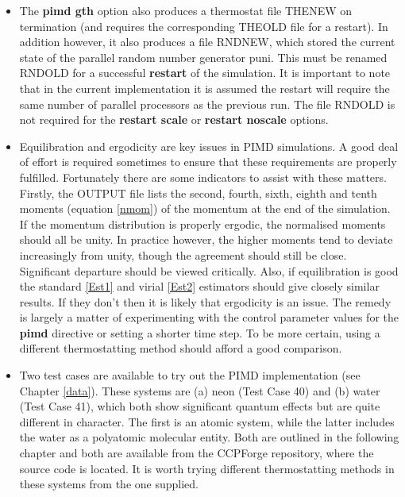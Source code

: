 \begin{itemize}
 \item The {\bf pimd gth} option also produces a thermostat file
   THENEW  on termination (and requires the
   corresponding THEOLD file for a restart). In addition however, it
   also produces a file RNDNEW,  which stored the
   current state of the \DD parallel random number generator {\sc
     puni}. This must be renamed RNDOLD  for a
   successful {\bf restart} of the simulation. It is important to
   note that in the current implementation it is assumed the restart
   will require the same number of parallel processors as the previous
   run. The file RNDOLD is not required for the {\bf restart scale} or
   {\bf restart noscale} options.

\item Equilibration and ergodicity are key issues in PIMD
  simulations. A good deal of effort is required sometimes to ensure
  that these requirements are properly fulfilled. Fortunately there
  are some indicators to assist with these matters. Firstly, the
  OUTPUT file lists the second, fourth, sixth, eighth and tenth
  moments (equation \ref{nmom}) of the momentum at the end of the
  simulation. If the momentum distribution is properly ergodic, the
  normalised moments should all be unity. In practice however, the
  higher moments tend to deviate increasingly from unity, though the
  agreement should still be close. Significant departure should be
  viewed critically. Also, if equilibration is good the standard
  \ref{Est1} and virial \ref{Est2} estimators should give closely
  similar results. If they don't then it is likely that ergodicity is
  an issue. The remedy is largely a matter of experimenting with the
  control parameter values for the {\bf pimd} directive or setting a
  shorter time step. To be more certain, using a different
  thermostatting method should afford a good comparison.

\item Two test cases are available to try out the \DD{} PIMD
  implementation (see Chapter \ref{data}). These systems are (a)
  neon (Test Case 40) and (b) water (Test Case 41), which both show
  significant quantum effects but are quite different in character.
  The first is an atomic system, while the latter includes the water
  as a polyatomic molecular entity. Both are outlined in the following
  chapter and both are available from the CCPForge repository, where
  the source code is located. It is worth trying different
  thermostatting methods in these systems from the one supplied.
\end{itemize}


